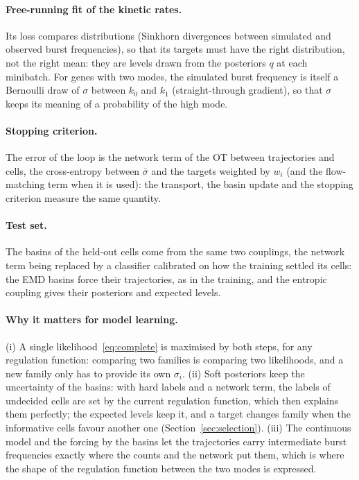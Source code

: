 \documentclass[a4paper, 11pt]{article}
\theoremstyle{plain}
\theoremstyle{remark}
\begin{document}
\paragraph{Free-running fit of the kinetic rates.} Its loss compares distributions (Sinkhorn divergences between simulated and observed burst frequencies), so that its targets must have the right distribution, not the right mean: they are levels drawn from the posteriors $q$ at each minibatch. For genes with two modes, the simulated burst frequency is itself a Bernoulli draw of $\sigma$ between $k_0$ and $k_1$ (straight-through gradient), so that $\sigma$ keeps its meaning of a probability of the high mode.

\paragraph{Stopping criterion.} The error of the loop is the network term of the OT between trajectories and cells, the cross-entropy between $\bar\sigma$ and the targets weighted by $w_i$ (and the flow-matching term when it is used): the transport, the basin update and the stopping criterion measure the same quantity.

\paragraph{Test set.} The basins of the held-out cells come from the same two couplings, the network term being replaced by a classifier calibrated on how the training settled its cells: the EMD basins force their trajectories, as in the training, and the entropic coupling gives their posteriors and expected levels.

\paragraph{Why it matters for model learning.} (i) A single likelihood~\eqref{eq:complete} is maximised by both steps, for any regulation function: comparing two families is comparing two likelihoods, and a new family only has to provide its own $\sigma_i$. (ii) Soft posteriors keep the uncertainty of the basins: with hard labels and a network term, the labels of undecided cells are set by the current regulation function, which then explains them perfectly; the expected levels keep it, and a target changes family when the informative cells favour another one (Section~\ref{sec:selection}). (iii) The continuous model and the forcing by the basins let the trajectories carry intermediate burst frequencies exactly where the counts and the network put them, which is where the shape of the regulation function between the two modes is expressed.
\end{document}
